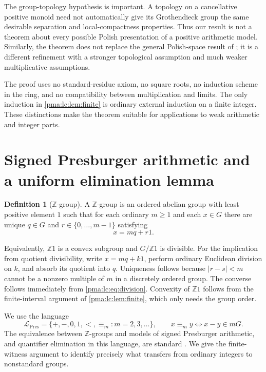 \documentclass[11pt]{article}
\numberwithin{equation}{section}
\theoremstyle{definition}
\newtheorem{definition}[definition]{Definition}
\theoremstyle{remark}
\newcommand{\Z}{\mathbb Z}
\newcommand{\pres}{\mathcal L_{\mathrm{Pres}}}
\begin{document}
The group-topology hypothesis is important. A topology on a cancellative
positive monoid need not automatically give its Grothendieck group the
same desirable separation and local-compactness properties. Thus our
result is not a theorem about every possible Polish presentation of a
positive arithmetic model. Similarly, the theorem does not replace the
general Polish-space result of \cite{Glazer}; it is a different refinement
with a stronger topological assumption and much weaker multiplicative
assumptions.

The proof uses no standard-residue axiom, no square roots, no induction
scheme in the ring, and no compatibility between multiplication and limits.
The only induction in \cref{pma:lc:lem:finite} is ordinary external induction on
a finite integer. These distinctions make the theorem suitable for
applications to weak arithmetic and integer parts.

\section{Signed Presburger arithmetic and a uniform elimination lemma}
\label{pma:lc:sec:presburger}

\begin{definition}[$\Z$-group]
A $\Z$-group is an ordered abelian group with least positive element $1$
such that for each ordinary $m\ge1$ and each $x\in G$ there are unique
$q\in G$ and $r\in\{0,\ldots,m-1\}$ satisfying
\begin{equation}\label{pma:lc:eq:division}
 x=mq+r1.
\end{equation}
\end{definition}

Equivalently, $\Z1$ is a convex subgroup and $G/\Z1$ is divisible.
For the implication from quotient divisibility, write $x=mq+k1$, perform
ordinary Euclidean division on $k$, and absorb its quotient into $q$.
Uniqueness follows because $|r-s|<m$ cannot be a nonzero multiple of $m$
in a discretely ordered group. The converse follows immediately from
\eqref{pma:lc:eq:division}. Convexity of $\Z1$ follows from the finite-interval
argument of \cref{pma:lc:lem:finite}, which only needs the group order.

We use the language
\[
 \pres=\{+,-,0,1,<,\equiv_m:m=2,3,\ldots\},
 \qquad x\equiv_m y\iff x-y\in mG.
\]
The equivalence between $\Z$-groups and models of signed Presburger
arithmetic, and quantifier elimination in this language, are standard
\cite{Cluckers}. We give the finite-witness argument to identify precisely
what transfers from ordinary integers to nonstandard groups.
\end{document}
